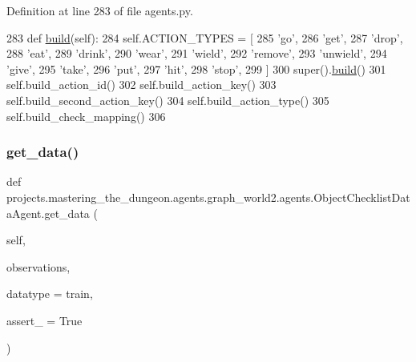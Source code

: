 Definition at line 283 of file agents.\+py.


\begin{DoxyCode}
283     \textcolor{keyword}{def }\hyperlink{namespaceparlai_1_1mturk_1_1tasks_1_1talkthewalk_1_1download_a8c0fbb9b6dfe127cb8c1bd6e7c4e33fd}{build}(self):
284         self.ACTION\_TYPES = [
285             \textcolor{stringliteral}{'go'},
286             \textcolor{stringliteral}{'get'},
287             \textcolor{stringliteral}{'drop'},
288             \textcolor{stringliteral}{'eat'},
289             \textcolor{stringliteral}{'drink'},
290             \textcolor{stringliteral}{'wear'},
291             \textcolor{stringliteral}{'wield'},
292             \textcolor{stringliteral}{'remove'},
293             \textcolor{stringliteral}{'unwield'},
294             \textcolor{stringliteral}{'give'},
295             \textcolor{stringliteral}{'take'},
296             \textcolor{stringliteral}{'put'},
297             \textcolor{stringliteral}{'hit'},
298             \textcolor{stringliteral}{'stop'},
299         ]
300         super().\hyperlink{namespaceparlai_1_1mturk_1_1tasks_1_1talkthewalk_1_1download_a8c0fbb9b6dfe127cb8c1bd6e7c4e33fd}{build}()
301         self.build\_action\_id()
302         self.build\_action\_key()
303         self.build\_second\_action\_key()
304         self.build\_action\_type()
305         self.build\_check\_mapping()
306 
\end{DoxyCode}
\mbox{\label{classprojects_1_1mastering__the__dungeon_1_1agents_1_1graph__world2_1_1agents_1_1ObjectChecklistDataAgent_a2e033cb4d1df95267370a9eb0b55b5e9}} 
\subsubsection{\texorpdfstring{get\+\_\+data()}{get\_data()}}
{\footnotesize\ttfamily def projects.\+mastering\+\_\+the\+\_\+dungeon.\+agents.\+graph\+\_\+world2.\+agents.\+Object\+Checklist\+Data\+Agent.\+get\+\_\+data (\begin{DoxyParamCaption}\item[{}]{self,  }\item[{}]{observations,  }\item[{}]{datatype = {\ttfamily \textquotesingle{}train\textquotesingle{}},  }\item[{}]{assert\+\_\+ = {\ttfamily True} }\end{DoxyParamCaption})}



